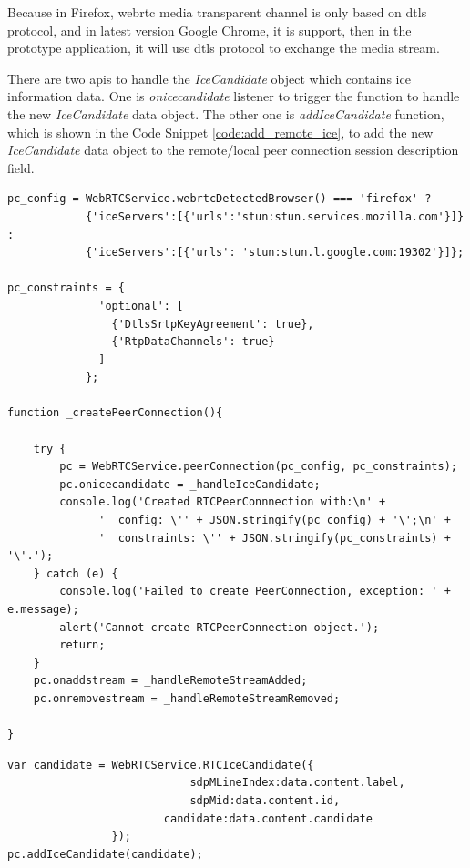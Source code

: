 \par Because in Firefox, \gls{webrtc} media transparent channel is only based on \gls{dtls} protocol, and in latest version Google Chrome, it is support, then in the prototype application, it will use \gls{dtls} protocol to exchange the media stream.

\par There are two \gls{api}s to handle the \textit{IceCandidate} object which contains \gls{ice} information data. One is \textit{onicecandidate} listener to trigger the function to handle the new \textit{IceCandidate} data object. The other one is \textit{addIceCandidate} function, which is shown in the Code Snippet \ref{code:add_remote_ice}, to add the new \textit{IceCandidate} data object to the remote/local peer connection session description field. 

\begin{lstlisting}[caption={Create Peer Connection function},label={code:create_peer_connection}]
pc_config = WebRTCService.webrtcDetectedBrowser() === 'firefox' ?
  			{'iceServers':[{'urls':'stun:stun.services.mozilla.com'}]} :
  			{'iceServers':[{'urls': 'stun:stun.l.google.com:19302'}]};

pc_constraints = {
			  'optional': [
			    {'DtlsSrtpKeyAgreement': true},
			    {'RtpDataChannels': true}
			  ]
			};
			
function _createPeerConnection(){

	try {
		pc = WebRTCService.peerConnection(pc_config, pc_constraints);
		pc.onicecandidate = _handleIceCandidate;
		console.log('Created RTCPeerConnnection with:\n' +
		      '  config: \'' + JSON.stringify(pc_config) + '\';\n' +
		      '  constraints: \'' + JSON.stringify(pc_constraints) + '\'.');
	} catch (e) {
		console.log('Failed to create PeerConnection, exception: ' + e.message);
		alert('Cannot create RTCPeerConnection object.');
		return;
	}
	pc.onaddstream = _handleRemoteStreamAdded;
	pc.onremovestream = _handleRemoteStreamRemoved;

}
\end{lstlisting}

\begin{lstlisting}[caption={Add Remote IceCandidate function},label={code:add_remote_ice}]
var candidate = WebRTCService.RTCIceCandidate({
					    	sdpMLineIndex:data.content.label,
					    	sdpMid:data.content.id,
					    candidate:data.content.candidate
				});
pc.addIceCandidate(candidate);

\end{lstlisting}

